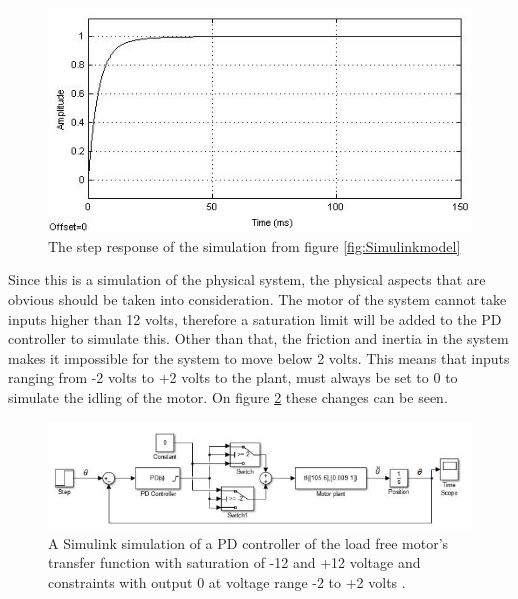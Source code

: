 \begin{figure}[h!]
\centering
\includegraphics[scale=0.7]{Billeder/SimuStepPDNoConstrains.jpg}
\caption{ The step response of the simulation from figure \ref{fig:Simulinkmodel} }
\label{fig:SimuStepPDNoConstrains}
\end{figure}

Since this is a simulation of the physical system, the physical aspects that are obvious should be taken into consideration. The motor of the system cannot take inputs higher than 12 volts, therefore a saturation limit will be added to the PD controller to simulate this. Other than that, the friction and inertia in the system makes it impossible for the system to move below 2 volts. This means that inputs ranging from -2 volts to +2 volts to the plant, must always be set to 0 to simulate the idling of the motor. On figure \ref{fig:simulinkmodelwithconstrains} these changes can be seen.

\begin{figure}[h!]
\centering
\includegraphics[scale=0.7]{Billeder/simulinkmodelwithconstrains.jpg}
\caption{ A Simulink simulation of a PD controller of the load free motor’s transfer function with saturation of -12 and +12 voltage and constraints with output 0 at voltage range -2 to +2 volts . }
\label{fig:simulinkmodelwithconstrains}
\end{figure}

